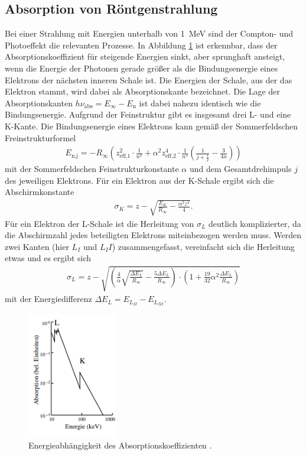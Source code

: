 \subsection{Absorption von Röntgenstrahlung}
Bei einer Strahlung mit Energien unterhalb von \qty[]{1}{\mega\electronvolt} sind der Compton- und Photoeffekt die relevanten Prozesse.
In Abbildung \ref{fig:absorption} ist erkennbar, dass der Absorptionskoeffizient für steigende Energien sinkt, aber sprunghaft ansteigt, wenn die Energie der 
Photonen gerade größer als die Bindungsenergie eines Elektrons der nächsten inneren Schale ist.
Die Energien der Schale, aus der das Elektron stammt, wird dabei als Absorptionskante bezeichnet.
Die Lage der Absorptionskanten  $h \nu_\text{abs} = E_\infty - E_\text{n}$ ist dabei nahezu identisch wie die Bindungsenergie.
Aufgrund der Feinstruktur gibt es insgesamt drei L- und eine K-Kante.
Die Bindungsenergie eines Elektrons kann gemäß der Sommerfeldschen Freinstrukturformel 
\begin{align}
    E_\text{n,j} = -R_\infty \left(z_\text{eff,1}^2 \cdot \frac{1}{n^2} + \alpha^2 z_\text{eff,2}^4 \cdot \frac{1}{n^3} \left(\frac{1}{j + \frac{1}{2}} - \frac{3}{4n}\right)\right)
    \label{eq:sommerfeld}
\end{align} 
mit der Sommerfeldschen Feinstrukturkonstante $\alpha$ und dem Gesamtdrehimpuls $j$ des jeweiligen Elektrons.
Für ein Elektron aus der K-Schale ergibt sich die Abschirmkonstante
\begin{align}
    \sigma_K = z - \sqrt{\frac{E_K}{R_\infty} - \frac{\alpha^2 z^4}{4}}.
    \label{eq:abschirmung_k}
\end{align}
Für ein Elektron der L-Schale ist die Herleitung von $\sigma_L$ deutlich komplizierter, da die Abschirmzahl jedes beteiligten Elektrons miteinbezogen werden muss.
Werden zwei Kanten (hier $L_I$ und $L_II$) zusammengefasst, vereinfacht sich die Herleitung etwas und es ergibt sich
\begin{align}
    \sigma_L = z - \sqrt{\left(\frac{4}{\alpha}\sqrt{\frac{\Delta E_L}{R_\infty}} - \frac{5 \Delta E_L}{R_\infty}\right)
    \cdot \left(1 + \frac{19}{32} \alpha^2 \frac{\Delta E_L}{R_\infty}\right)}
    \label{eq:abschirmung_l}
\end{align}
mit der Energiedifferenz $\Delta E_L = E_{L_{II}} - E_{L_{III}}$.


\begin{figure}[H]
    \centering
    \includegraphics[height= 5.5cm]{Abbildungen/absorption.png}
    \caption[]{Energieabhängigkeit des Absorptionskoeffizienten \cite[]{man:v602}.}
    \label{fig:absorption}
\end{figure}




